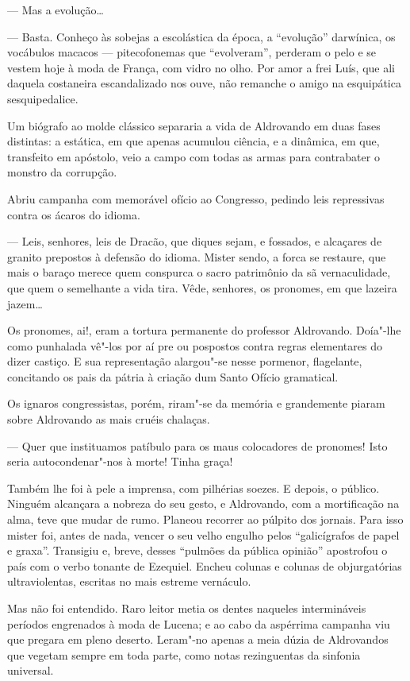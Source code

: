 --- Mas a evolução\ldots{}

--- Basta. Conheço às sobejas a escolástica da época, a ``evolução''
darwínica, os vocábulos macacos --- pitecofonemas que ``evolveram'',
perderam o pelo e se vestem hoje à moda de França, com vidro no olho.
Por amor a frei Luís, que ali daquela costaneira escandalizado nos ouve,
não remanche o amigo na esquipática sesquipedalice.

Um biógrafo ao molde clássico separaria a vida de Aldrovando em duas
fases distintas: a estática, em que apenas acumulou ciência, e a
dinâmica, em que, transfeito em apóstolo, veio a campo com todas as
armas para contrabater o monstro da corrupção.

Abriu campanha com memorável ofício ao Congresso, pedindo leis
repressivas contra os ácaros do idioma.

--- Leis, senhores, leis de Dracão, que diques sejam, e fossados, e
alcaçares de granito prepostos à defensão do idioma. Mister sendo, a
forca se restaure, que mais o baraço merece quem conspurca o sacro
patrimônio da sã vernaculidade, que quem o semelhante a vida tira. Vêde,
senhores, os pronomes, em que lazeira jazem\ldots{}

Os pronomes, ai!, eram a tortura permanente do professor Aldrovando.
Doía"-lhe como punhalada vê"-los por aí pre ou pospostos contra regras
elementares do dizer castiço. E sua representação alargou"-se nesse
pormenor, flagelante, concitando os pais da pátria à criação dum Santo
Ofício gramatical.

Os ignaros congressistas, porém, riram"-se da memória e grandemente
piaram sobre Aldrovando as mais cruéis chalaças.

--- Quer que instituamos patíbulo para os maus colocadores de pronomes!
Isto seria autocondenar"-nos à morte! Tinha graça!

Também lhe foi à pele a imprensa, com pilhérias soezes. E depois, o
público. Ninguém alcançara a nobreza do seu gesto, e Aldrovando, com a
mortificação na alma, teve que mudar de rumo. Planeou recorrer ao
púlpito dos jornais. Para isso mister foi, antes de nada, vencer o seu
velho engulho pelos ``galicígrafos de papel e graxa''. Transigiu e,
breve, desses ``pulmões da pública opinião'' apostrofou o país com o
verbo tonante de Ezequiel. Encheu colunas e colunas de objurgatórias
ultraviolentas, escritas no mais estreme vernáculo.

Mas não foi entendido. Raro leitor metia os dentes naqueles
intermináveis períodos engrenados à moda de Lucena; e ao cabo da
aspérrima campanha viu que pregara em pleno deserto. Leram"-no apenas a
meia dúzia de Aldrovandos que vegetam sempre em toda parte, como notas
rezinguentas da sinfonia universal.

